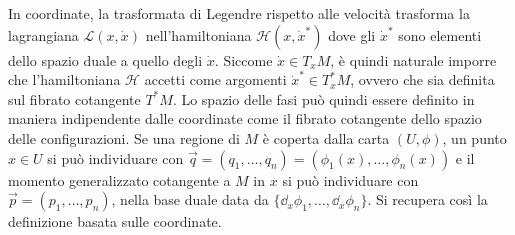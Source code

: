 In coordinate, la trasformata di Legendre rispetto alle velocità trasforma la lagrangiana $\mathcal{L}(x,\dot{x})$ nell'hamiltoniana $\mathcal{H}(x,\dot{x}^*)$ dove gli $\dot{x}^*$ sono elementi dello spazio duale a quello degli $\dot{x}$. Siccome $\dot{x} \in T_x M$, è quindi naturale imporre che l'hamiltoniana $\mathcal{H}$ accetti come argomenti $\dot{x}^* \in T_x^* M$, ovvero che sia definita sul fibrato cotangente $T^*M$. Lo spazio delle fasi può quindi essere definito in maniera indipendente dalle coordinate come il fibrato cotangente dello spazio delle configurazioni. Se una regione di $M$ è coperta dalla carta $(U,\phi)$, un punto $x \in U$ si può individuare con $\vec{q} = (q_1, \ldots, q_n) = (\phi_1(x), \ldots, \phi_n(x))$ e il momento generalizzato cotangente a $M$ in $x$ si può individuare con $\vec{p}=(p_1, \ldots, p_n)$, nella base duale data da $\{\dd_x \phi_1, \ldots, \dd_x \phi_n\} $. Si recupera così la definizione basata sulle coordinate.

